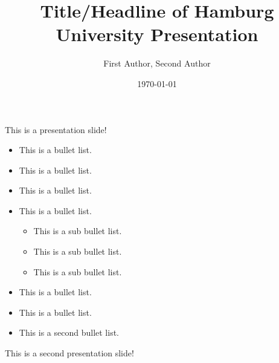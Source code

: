 \documentclass[aspectratio=169,17pt]{tuhh_presentation}
\title{Title/Headline of Hamburg University Presentation}
\date{\today}
\author[Corresponding Author]{First Author, Second Author}
\institute{Corresponding Authors Institute}
\begin{document}
\titlepage

\begin{frame}{This is a presentation slide!}
    \begin{minipage}{0.49\textwidth}
        \begin{itemize}
            \item This is a bullet list.
            \item This is a bullet list.
            \item This is a bullet list.
            \item This is a bullet list.

            \begin{itemize}
                \item This is a sub bullet list.
                \item This is a sub bullet list.
                \item This is a sub bullet list.
            \end{itemize}
            \item This is a bullet list.
            \item This is a bullet list.
        \end{itemize}
    \end{minipage}
    \begin{minipage}{0.49\textwidth}
        \begin{itemize}
            \item This is a second bullet list.
        \end{itemize}
    \end{minipage}
\end{frame}

\begin{frame}{This is a second presentation slide!}




\end{frame}

\finalpage
\end{document}
